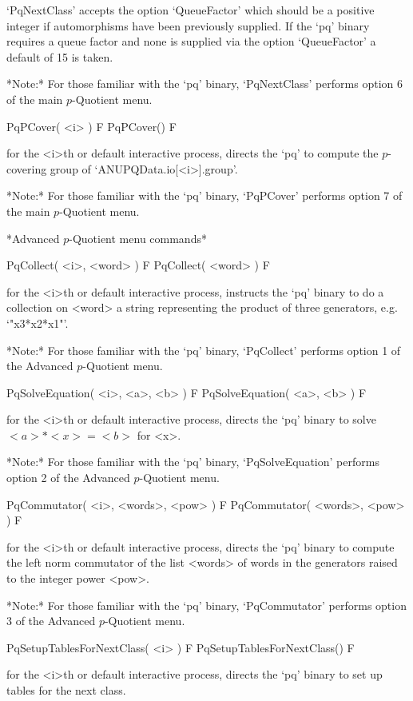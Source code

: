`PqNextClass'  accepts  the  option  `QueueFactor'  which  should  be   a
positive integer if automorphisms have been previously supplied.  If  the
`pq' binary requires a queue factor and none is supplied via  the  option
`QueueFactor' a default of 15 is taken.

*Note:* For those familiar with the `pq' binary,  `PqNextClass'  performs
option 6 of the main $p$-Quotient menu.

\>PqPCover( <i> ) F
\>PqPCover() F

for the <i>th or default interactive {\ANUPQ} process, directs  the  `pq'
to compute the $p$-covering group of `ANUPQData.io[<i>].group'.

*Note:* For those familiar with  the  `pq'  binary,  `PqPCover'  performs
option 7 of the main $p$-Quotient menu.

*Advanced $p$-Quotient menu commands*

\>PqCollect( <i>, <word> ) F
\>PqCollect( <word> ) F

for the <i>th or default interactive {\ANUPQ} process, instructs the `pq'
binary to do a collection on <word> a string representing the product  of
three generators, e.g. `"x3*x2*x1"'.

*Note:* For those familiar with the  `pq'  binary,  `PqCollect'  performs
option 1 of the Advanced $p$-Quotient menu.

\>PqSolveEquation( <i>, <a>, <b> ) F
\>PqSolveEquation( <a>, <b> ) F

for the <i>th or default interactive {\ANUPQ} process, directs  the  `pq'
binary to solve $<a> * <x> = <b>$ for <x>. 

*Note:* 
For those familiar  with  the  `pq'  binary,  `PqSolveEquation'  performs
option 2 of the Advanced $p$-Quotient menu.

\>PqCommutator( <i>, <words>, <pow> ) F
\>PqCommutator( <words>, <pow> ) F

for the <i>th or default interactive {\ANUPQ} process, directs  the  `pq'
binary to compute the left norm commutator of the list <words>  of  words
in the generators raised to the integer power <pow>.

*Note:*
For those familiar with the `pq' binary, `PqCommutator' performs option 3
of the Advanced $p$-Quotient menu.

\>PqSetupTablesForNextClass( <i> ) F
\>PqSetupTablesForNextClass() F

for the <i>th or default interactive {\ANUPQ} process, directs  the  `pq'
binary to set up tables for the next class.

